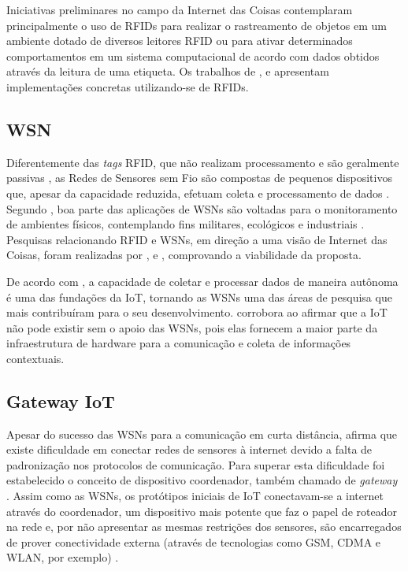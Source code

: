 \documentclass[twoside,english,brazilian]{UNISINOSmonografia}
\begin{document}
	Iniciativas preliminares no campo da Internet das Coisas contemplaram 
	principalmente o uso de RFIDs para realizar o rastreamento de objetos em 
	um ambiente dotado de diversos leitores RFID ou para ativar determinados 
	comportamentos em um sistema computacional de acordo com dados obtidos 
	através da leitura de uma etiqueta. Os trabalhos de , 
	 e  apresentam 
	implementações concretas utilizando-se de RFIDs.

\subsection{WSN}
	Diferentemente das \textit{tags} RFID, que não realizam processamento e 
	são geralmente passivas \cite{Atzori2010b}, as Redes de Sensores sem Fio 
	são compostas de pequenos dispositivos que, apesar da capacidade reduzida, 
	efetuam coleta e processamento de dados \cite{Sakthidharan2012}. Segundo 
	, boa parte das aplicações de WSNs são voltadas para 
	o monitoramento de ambientes físicos, contemplando fins militares, 
	ecológicos e industriais \cite{Suhonen2012}. Pesquisas relacionando RFID e 
	WSNs, em direção a uma visão de Internet das Coisas, foram realizadas por 
	,  e , 
	comprovando a viabilidade da proposta.
	
	De acordo com , a capacidade de coletar e processar 
	dados de maneira autônoma é uma das fundações da IoT, tornando as WSNs uma 
	das áreas de pesquisa que mais contribuíram para o seu desenvolvimento. 
	 corrobora ao afirmar que a IoT não pode existir sem 
	o apoio das WSNs, pois elas fornecem a maior parte da infraestrutura de 
	hardware para a comunicação e coleta de informações contextuais.

\subsection{Gateway IoT}
	Apesar do sucesso das WSNs para a comunicação em curta distância, 
	 afirma que existe dificuldade 
	em conectar redes de sensores à internet devido a falta de padronização 
	nos protocolos de comunicação. Para superar esta dificuldade foi 
	estabelecido o conceito de dispositivo coordenador, também chamado de 
	\textit{gateway} \cite{Steenkamp2009}. 
	Assim como as WSNs, os protótipos iniciais de IoT conectavam-se a internet 
	através do coordenador, um dispositivo mais potente que faz o papel de 
	roteador na rede \cite{Kuryla2010} e, por não apresentar as mesmas 
	restrições dos sensores, são encarregados de prover 
	conectividade externa (através de 
	tecnologias como GSM, CDMA e WLAN, por exemplo) \cite{Liu2012}.
	
\end{document}
